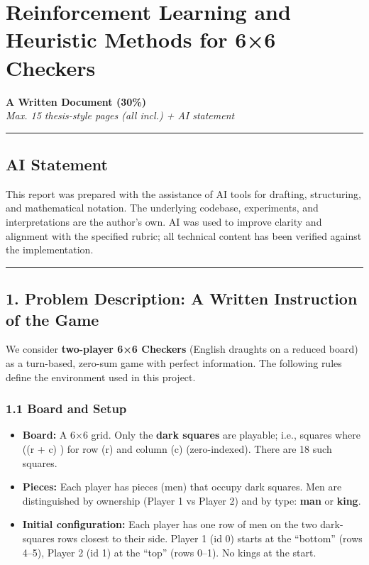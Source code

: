\documentclass[
]{article}
\author{}
\date{}
\providecommand{\tightlist}{%
  \setlength{\itemsep}{0pt}\setlength{\parskip}{0pt}}
\begin{document}
\section{Reinforcement Learning and Heuristic Methods for 6×6
Checkers}\label{reinforcement-learning-and-heuristic-methods-for-66-checkers}

\textbf{A Written Document (30\%)}\\
\emph{Max. 15 thesis-style pages (all incl.) + AI statement}

\begin{center}\rule{0.5\linewidth}{0.5pt}\end{center}

\subsection{AI Statement}\label{ai-statement}

This report was prepared with the assistance of AI tools for drafting,
structuring, and mathematical notation. The underlying codebase,
experiments, and interpretations are the author's own. AI was used to
improve clarity and alignment with the specified rubric; all technical
content has been verified against the implementation.

\begin{center}\rule{0.5\linewidth}{0.5pt}\end{center}

\subsection{1. Problem Description: A Written Instruction of the
Game}\label{problem-description-a-written-instruction-of-the-game}

We consider \textbf{two-player 6×6 Checkers} (English draughts on a
reduced board) as a turn-based, zero-sum game with perfect information.
The following rules define the environment used in this project.

\subsubsection{1.1 Board and Setup}\label{board-and-setup}

\begin{itemize}
\tightlist
\item
  \textbf{Board:} A 6×6 grid. Only the \textbf{dark squares} are
  playable; i.e., squares where ((r + c)  ) for row (r)
  and column (c) (zero-indexed). There are 18 such squares.
\item
  \textbf{Pieces:} Each player has pieces (men) that occupy dark
  squares. Men are distinguished by ownership (Player 1 vs Player 2) and
  by type: \textbf{man} or \textbf{king}.
\item
  \textbf{Initial configuration:} Each player has one row of men on the
  two dark-squares rows closest to their side. Player 1 (id 0) starts at
  the ``bottom'' (rows 4--5), Player 2 (id 1) at the ``top'' (rows
  0--1). No kings at the start.
\end{itemize}
\end{document}
